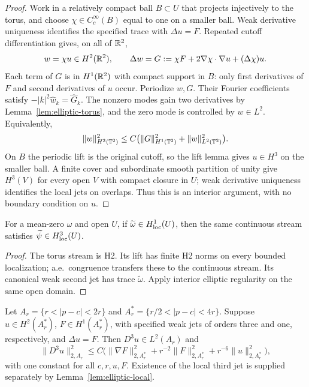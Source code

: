\begin{proof}
\leanok
Work in a relatively compact ball $B\subset U$ that projects injectively
to the torus, and choose $\chi\in C_c^\infty(B)$ equal to one on a smaller
ball. Weak derivative uniqueness identifies the specified trace with
$\Delta u=F$. Repeated cutoff differentiation gives, on all of $\mathbb{R}^2$,
\[
 w=\chi u\in H^2(\mathbb{R}^2),\qquad
 \Delta w=G:=\chi F+2\nabla\chi\cdot\nabla u+(\Delta\chi)u.
\]
Each term of $G$ is in $H^1(\mathbb{R}^2)$ with compact support in $B$:
only first derivatives of $F$ and second derivatives of $u$ occur.
Periodize $w,G$. Their Fourier coefficients satisfy
$-|k|^2\widehat w_k=\widehat G_k$.
The nonzero modes gain two derivatives by
Lemma~\ref{lem:elliptic-torus}, and the zero mode is controlled by
$w\in L^2$. Equivalently,
\[
 \|w\|_{H^3(\mathbb{T}^2)}^2
 \le C\bigl(\|G\|_{H^1(\mathbb{T}^2)}^2+\|w\|_{L^2(\mathbb{T}^2)}^2\bigr).
\]
On $B$ the periodic lift is the original cutoff, so the lift lemma gives
$u\in H^3$ on the smaller ball. A finite cover and subordinate smooth
partition of unity give $H^3(V)$ for every open $V$ with compact closure
in $U$; weak derivative uniqueness identifies the local jets on overlaps.
Thus this is an interior argument, with no boundary condition on $u$.
\end{proof}

\begin{lemma}
\label{lem:stream-h3-of-vorticity-h1}
\leanok
For a mean-zero $\omega$ and open $U$, if
$\widetilde\omega\in H^1_{\rm loc}(U)$, then the same continuous stream
satisfies $\widetilde\psi\in H^3_{\rm loc}(U)$.
\end{lemma}

\begin{proof}
\leanok
The torus stream is H2. Its lift has finite H2 norms on every bounded
localization; a.e.\ congruence transfers these to the continuous stream.
Its canonical weak second jet has trace $\widetilde\omega$.
Apply interior elliptic regularity on the same open domain.
\end{proof}

\begin{lemma}
\label{lem:elliptic-dyadic}
\leanok
Let $A_r=\{r<|p-c|<2r\}$ and $A_r^*=\{r/2<|p-c|<4r\}$.
Suppose $u\in H^2(A_r^*)$, $F\in H^1(A_r^*)$, with specified weak jets
of orders three and one, respectively, and $\Delta u=F$.
Then $D^3u\in L^2(A_r)$ and
\[
 \|D^3u\|_{2,A_r}^2\le C\bigl(\|\nabla F\|_{2,A_r^*}^2+
 r^{-2}\|F\|_{2,A_r^*}^2+r^{-6}\|u\|_{2,A_r^*}^2\bigr),
\]
with one constant for all $c,r,u,F$. Existence of the local third jet
is supplied separately by Lemma~\ref{lem:elliptic-local}.
\end{lemma}

